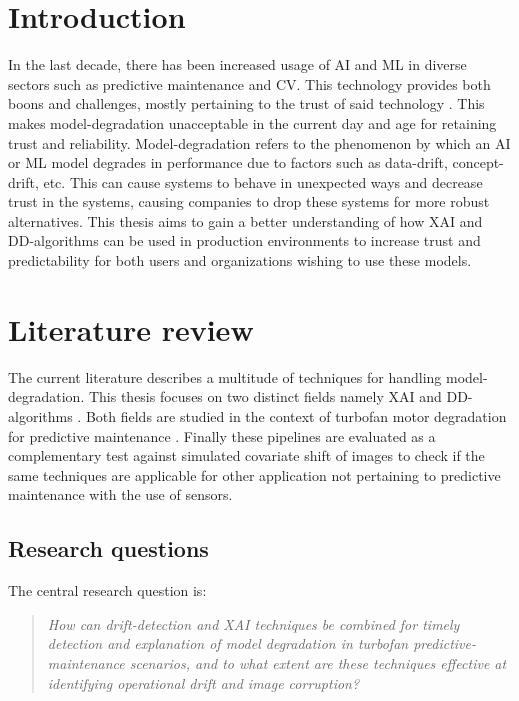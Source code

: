 
\section{Introduction}
\label{sec:introduction}

In the last decade, there has been increased usage of AI and ML in diverse sectors such as predictive maintenance and CV.
This technology provides both boons and challenges, mostly pertaining to the trust of said technology \autocite{Radhakrishnan2020}.
This makes model-degradation unacceptable in the current day and age for retaining trust and reliability.
Model-degradation refers to the phenomenon by which an AI or ML model degrades in performance due to factors such as data-drift, concept-drift, etc. This can cause systems to behave in unexpected ways and decrease trust in the systems, causing companies to drop these systems for more robust alternatives.
This thesis aims to gain a better understanding of how XAI and DD-algorithms can be used in production environments to increase trust and predictability for both users and organizations wishing to use these models.


\section{Literature review}
\label{sec:literature}

The current literature describes a multitude of techniques for handling model-degradation.
This thesis focuses on two distinct fields namely XAI \autocite{Ribeiro2016} and DD-algorithms \autocite{Bayram2022}.
Both fields are studied in the context of turbofan motor degradation for predictive maintenance \autocite{Saxena2008}.
Finally these pipelines are evaluated as a complementary test against simulated covariate shift of images \autocite{Hendrycks2019} to check if the same techniques are applicable for other application not pertaining to predictive maintenance with the use of sensors.

\subsection{Research questions}
The central research question is:
\begin{quote}
  \textit{How can drift-detection and XAI techniques be combined for timely detection and explanation of model degradation in turbofan predictive-maintenance scenarios, and to what extent are these techniques effective at identifying operational drift and image corruption?}
\end{quote}

